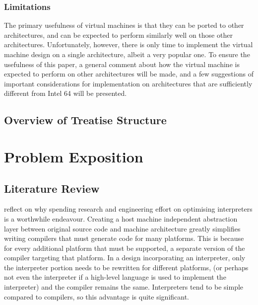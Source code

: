 		\subsection{Limitations}
			The primary usefulness of virtual machines is that they can be ported to other architectures, and can be expected to perform similarly well on those other architectures. Unfortunately, however, there is only time to implement the virtual machine design on a single architecture, albeit a very popular one. To ensure the usefulness of this paper, a general comment about how the virtual machine is expected to perform on other architectures will be made, and a few suggestions of important considerations for implementation on architectures that are sufficiently  different from Intel 64 will be presented.
				
	\section{Overview of Treatise Structure}
	

\chapter{Problem Exposition}
	\section{Literature Review}
		\cite{structureinterpreters} reflect on why spending research and engineering effort on optimising interpreters is a worthwhile endeavour. Creating a host machine independent abstraction layer between original source code and machine architecture greatly simplifies writing compilers that must generate code for many platforms. This is because for every additional platform that must be supported, a separate version of the compiler targeting that platform. In a design incorporating an interpreter, only the interpreter portion needs to be rewritten for different platforms, (or perhaps not even the interpreter if a high-level language is used to implement the interpreter) and the compiler remains the same. Interpreters tend to be simple compared to compilers, so this advantage is quite significant.
		
